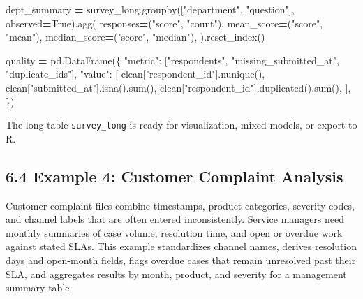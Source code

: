\documentclass[
  12pt,
]{article}
\newenvironment{Shaded}{\begin{snugshade}}{\end{snugshade}}
\newcommand{\BuiltInTok}[1]{#1}
\newcommand{\NormalTok}[1]{#1}
\newcommand{\OperatorTok}[1]{\textcolor[rgb]{0.81,0.36,0.00}{\textbf{#1}}}
\newcommand{\StringTok}[1]{\textcolor[rgb]{0.31,0.60,0.02}{#1}}
\newcommand{\VariableTok}[1]{\textcolor[rgb]{0.00,0.00,0.00}{#1}}
\begin{document}
\begin{Shaded}
\begin{Highlighting}[]
\NormalTok{dept\_summary }\OperatorTok{=}\NormalTok{ survey\_long.groupby([}\StringTok{"department"}\NormalTok{, }\StringTok{"question"}\NormalTok{], observed}\OperatorTok{=}\VariableTok{True}\NormalTok{).agg(}
\NormalTok{    responses}\OperatorTok{=}\NormalTok{(}\StringTok{"score"}\NormalTok{, }\StringTok{"count"}\NormalTok{),}
\NormalTok{    mean\_score}\OperatorTok{=}\NormalTok{(}\StringTok{"score"}\NormalTok{, }\StringTok{"mean"}\NormalTok{),}
\NormalTok{    median\_score}\OperatorTok{=}\NormalTok{(}\StringTok{"score"}\NormalTok{, }\StringTok{"median"}\NormalTok{),}
\NormalTok{).reset\_index()}

\NormalTok{quality }\OperatorTok{=}\NormalTok{ pd.DataFrame(\{}
    \StringTok{"metric"}\NormalTok{: [}\StringTok{"respondents"}\NormalTok{, }\StringTok{"missing\_submitted\_at"}\NormalTok{, }\StringTok{"duplicate\_ids"}\NormalTok{],}
    \StringTok{"value"}\NormalTok{: [}
\NormalTok{        clean[}\StringTok{"respondent\_id"}\NormalTok{].nunique(),}
\NormalTok{        clean[}\StringTok{"submitted\_at"}\NormalTok{].isna().}\BuiltInTok{sum}\NormalTok{(),}
\NormalTok{        clean[}\StringTok{"respondent\_id"}\NormalTok{].duplicated().}\BuiltInTok{sum}\NormalTok{(),}
\NormalTok{    ],}
\NormalTok{\})}
\end{Highlighting}
\end{Shaded}

The long table \texttt{survey\_long} is ready for visualization, mixed
models, or export to R.

\subsection{6.4 Example 4: Customer Complaint
Analysis}\label{example-4-customer-complaint-analysis}

Customer complaint files combine timestamps, product categories,
severity codes, and channel labels that are often entered
inconsistently. Service managers need monthly summaries of case volume,
resolution time, and open or overdue work against stated SLAs. This
example standardizes channel names, derives resolution days and
open-month fields, flags overdue cases that remain unresolved past their
SLA, and aggregates results by month, product, and severity for a
management summary table.
\end{document}
